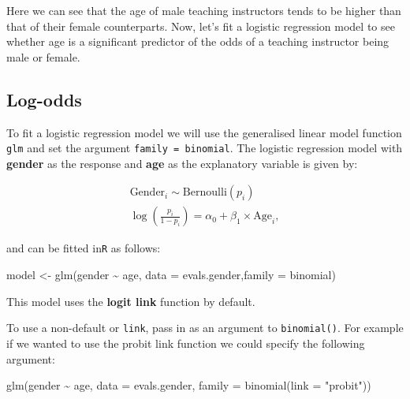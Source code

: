\documentclass[
  letterpaper,
  DIV=11,
  numbers=noendperiod]{scrartcl}
\newenvironment{Shaded}{\begin{snugshade}}{\end{snugshade}}
\newcommand{\AttributeTok}[1]{\textcolor[rgb]{0.40,0.45,0.13}{#1}}
\newcommand{\FunctionTok}[1]{\textcolor[rgb]{0.28,0.35,0.67}{#1}}
\newcommand{\NormalTok}[1]{\textcolor[rgb]{0.00,0.23,0.31}{#1}}
\newcommand{\OtherTok}[1]{\textcolor[rgb]{0.00,0.23,0.31}{#1}}
\newcommand{\SpecialCharTok}[1]{\textcolor[rgb]{0.37,0.37,0.37}{#1}}
\newcommand{\StringTok}[1]{\textcolor[rgb]{0.13,0.47,0.30}{#1}}
\begin{document}
Here we can see that the age of male teaching instructors tends to be
higher than that of their female counterparts. Now, let's fit a logistic
regression model to see whether age is a significant predictor of the
odds of a teaching instructor being male or female.

\subsection{Log-odds}\label{log-odds}

To fit a logistic regression model we will use the generalised linear
model function \texttt{glm} and set the argument
\texttt{family\ =\ binomial}. The logistic regression model with
\textbf{gender} as the response and \textbf{age} as the explanatory
variable is given by:

\[
\begin{aligned}
\text{Gender}_i \sim \mathrm{Bernoulli}(p_i) \\
\log\left(\frac{p_i}{1-p_i}\right) = \alpha_0 +\beta_1 \times \text{Age}_i,
\end{aligned}
\]

and can be fitted in\texttt{R} as follows:

\begin{Shaded}
\begin{Highlighting}[]
\NormalTok{model }\OtherTok{\textless{}{-}} \FunctionTok{glm}\NormalTok{(gender }\SpecialCharTok{\textasciitilde{}}\NormalTok{ age, }\AttributeTok{data =}\NormalTok{ evals.gender,}\AttributeTok{family =}\NormalTok{ binomial)}
\end{Highlighting}
\end{Shaded}

This model uses the \textbf{logit link} function by default.

\begin{tcolorbox}[enhanced jigsaw, colframe=quarto-callout-note-color-frame, toprule=.15mm, toptitle=1mm, opacitybacktitle=0.6, breakable, colback=white, opacityback=0, title=\textcolor{quarto-callout-note-color}{\faInfo}\hspace{0.5em}{Note}, rightrule=.15mm, bottomrule=.15mm, coltitle=black, colbacktitle=quarto-callout-note-color!10!white, leftrule=.75mm, left=2mm, arc=.35mm, bottomtitle=1mm, titlerule=0mm]

To use a non-default or \texttt{link}, pass in as an argument to
\texttt{binomial()}. For example if we wanted to use the probit link
function we could specify the following argument:

\begin{Shaded}
\begin{Highlighting}[]
\FunctionTok{glm}\NormalTok{(gender }\SpecialCharTok{\textasciitilde{}}\NormalTok{ age,}
    \AttributeTok{data =}\NormalTok{ evals.gender,}
    \AttributeTok{family =} \FunctionTok{binomial}\NormalTok{(}\AttributeTok{link =} \StringTok{"probit"}\NormalTok{))}
\end{Highlighting}
\end{Shaded}

\end{tcolorbox}
\end{document}

